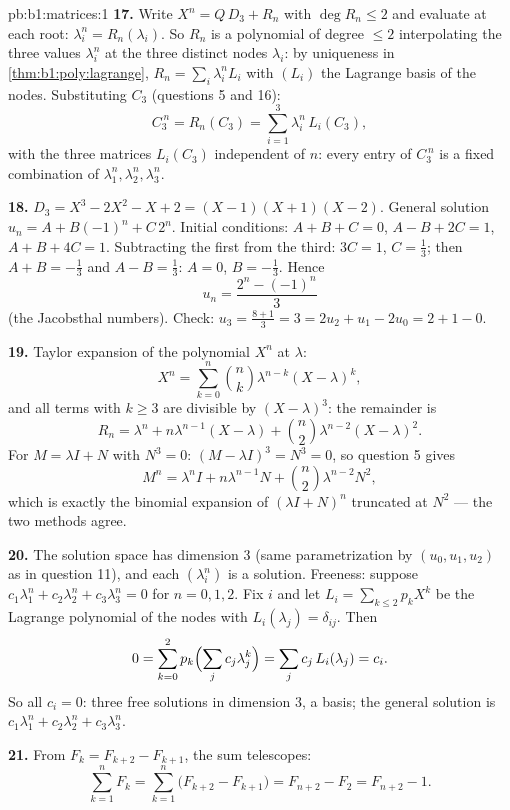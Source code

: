 \begin{solution}{pb:b1:matrices:1}
\textbf{17.} Write $X^n = Q\,D_3 + R_n$ with $\deg R_n \leq 2$
and evaluate at each root: $\lambda_i^n = R_n(\lambda_i)$. So
$R_n$ is a polynomial of degree $\leq 2$ interpolating the three
values $\lambda_i^n$ at the three distinct nodes $\lambda_i$: by
uniqueness in \cref{thm:b1:poly:lagrange}, $R_n = \sum_i
\lambda_i^n L_i$ with $(L_i)$ the Lagrange basis of the nodes.
Substituting $C_3$ (questions 5 and 16):
\[
C_3^{\,n} = R_n(C_3) = \sum_{i=1}^{3} \lambda_i^n\,L_i(C_3),
\]
with the three matrices $L_i(C_3)$ independent of $n$: every
entry of $C_3^{\,n}$ is a fixed combination of $\lambda_1^n,
\lambda_2^n, \lambda_3^n$.

\textbf{18.} $D_3 = X^3 - 2X^2 - X + 2 = (X-1)(X+1)(X-2)$.
General solution $u_n = A + B(-1)^n + C\,2^n$. Initial
conditions: $A + B + C = 0$, $A - B + 2C = 1$, $A + B + 4C = 1$.
Subtracting the first from the third: $3C = 1$, $C = \frac13$;
then $A + B = -\frac13$ and $A - B = \frac13$: $A = 0$, $B =
-\frac13$. Hence
\[
u_n = \frac{2^n - (-1)^n}{3}
\]
(the Jacobsthal numbers). Check: $u_3 = \frac{8 + 1}{3} = 3 =
2u_2 + u_1 - 2u_0 = 2 + 1 - 0$.

\textbf{19.} Taylor expansion of the polynomial $X^n$ at
$\lambda$:
\[
X^n = \sum_{k=0}^{n} \binom nk \lambda^{n-k}(X - \lambda)^k ,
\]
and all terms with $k \geq 3$ are divisible by $(X -
\lambda)^3$: the remainder is
\[
R_n = \lambda^n + n\lambda^{n-1}(X - \lambda) + \binom
n2\lambda^{n-2}(X - \lambda)^2 .
\]
For $M = \lambda I + N$ with $N^3 = 0$: $(M - \lambda I)^3 = N^3
= 0$, so question 5 gives
\[
M^n = \lambda^n I + n\lambda^{n-1} N + \binom n2
\lambda^{n-2} N^2 ,
\]
which is exactly the binomial expansion of $(\lambda I + N)^n$
truncated at $N^2$ --- the two methods agree.

\textbf{20.} The solution space has dimension $3$ (same
parametrization by $(u_0, u_1, u_2)$ as in question 11), and
each $(\lambda_i^n)$ is a solution. Freeness: suppose
$c_1\lambda_1^n + c_2\lambda_2^n + c_3\lambda_3^n = 0$ for $n =
0, 1, 2$. Fix $i$ and let $L_i = \sum_{k \leq 2} p_k X^k$ be the
Lagrange polynomial of the nodes with $L_i(\lambda_j) =
\delta_{ij}$. Then
\[
0 = \sum_{k=0}^{2} p_k\Bigl(\sum_j c_j\lambda_j^k\Bigr)
= \sum_j c_j\,L_i(\lambda_j) = c_i .
\]
So all $c_i = 0$: three free solutions in dimension $3$, a
basis; the general solution is $c_1\lambda_1^n +
c_2\lambda_2^n + c_3\lambda_3^n$.

\textbf{21.} From $F_k = F_{k+2} - F_{k+1}$, the sum telescopes:
\[
\sum_{k=1}^{n} F_k = \sum_{k=1}^{n}\bigl(F_{k+2} - F_{k+1}\bigr)
= F_{n+2} - F_2 = F_{n+2} - 1 .
\]


\end{solution}
